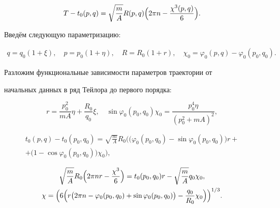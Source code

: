 $$

T- t_0(p, q)=\sqrt{\frac{m}{A}}R(p, q)\Bigl(2\pi n

-\frac{\chi^3(p,q)}{6}\Bigr).

$$

Введём следующую параметризацию:

\begin{gather}

q=q_0(1+\xi),

\quad 

p=p_0(1+\eta),

\quad 

 R=R_0(1+r),

 \quad 

\chi_0 =\varphi_0(p, q)-\varphi_0(p_0, q_0).


\end{gather}

 Разложим функциональные зависимости параметров траектории от

 начальных данных в ряд Тейлора до первого порядка:

$$

r= \frac{p_0^2}{mA}\eta +\frac{R_0}{q_0}\xi,

\quad 

\sin\varphi_0(p_0, q_0)\chi_0=\frac{p_0^4\eta }{(p_0^2+ mA)^2},

$$

\begin{multline}

 t_0(p, q)- t_0(p_0, q_0) =\sqrt{\frac{m}{A}}R_0 \bigl( (\varphi_0(p_0, q_0)-\sin\varphi_0(p_0, q_0) \bigr)r + \\ +\bigl(1-\cos\varphi_0(p_0, q_0))\chi_0\bigr),

\end{multline}


\begin{gather}

\sqrt{\frac{m}{A}}R_0\Bigl(2\pi n r-\frac{\chi^3}{6} \Bigr)=t_0(p_0, q_0)r

-\sqrt{\frac{m}{A}}q_0\chi_0,

\\

\chi=\Bigl(6\Bigl( r\bigl(2\pi n-\varphi_0(p_0, q_0)+\sin\varphi_0(p_0,

q_0)\bigr)-\frac{q_0}{R_0}\chi_0\Bigr)\Bigr)^{1/3}.

\end{gather}

